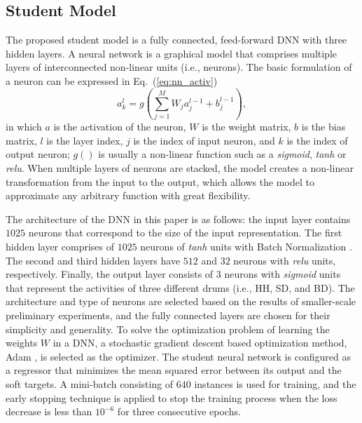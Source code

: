\documentclass{article}
\begin{document}
\subsection{Student Model}\label{subsec:nn}
The proposed student model is a fully connected, feed-forward DNN with three hidden layers. A neural network is a graphical model that comprises multiple layers of interconnected non-linear units (i.e., neurons). %
The basic formulation of a neuron can be expressed in Eq.~(\ref{eq:nn_activ})
\begin{equation}\label{eq:nn_activ}
a_{k}^{l} = g\left( \sum_{j=1}^{M} W_{j} a_{j}^{l-1} + b_{j}^{l-1}\right) ,
\end{equation}
in which $a$ is the activation of the neuron, $W$ is the weight matrix, $b$ is the bias matrix, $l$ is the layer index, $j$ is the index of input neuron, and $k$ is the index of output neuron; $g( )$ is usually a non-linear function such as a \textit{sigmoid}, \textit{tanh} or \textit{relu}. When multiple layers of neurons are stacked, the model creates a non-linear transformation from the input to the output, which allows the model to approximate any arbitrary function with great flexibility. 


The architecture of the DNN in this paper is as follows: the input layer contains $1025$ neurons that correspond to the size of the input representation. The first hidden layer comprises of $1025$ neurons of \textit{tanh} units with Batch Normalization \cite{Ioffe2015}. The second and third hidden layers have $512$ and $32$ neurons with \textit{relu} units, respectively. Finally, the output layer consists of 3 neurons with \textit{sigmoid} units that represent the activities of three different drums (i.e., HH, SD, and BD). The architecture and type of neurons are selected based on the results of smaller-scale preliminary experiments, and the fully connected layers are chosen for their simplicity and generality. To solve the optimization problem of learning the weights $W$ in a DNN, a stochastic gradient descent based optimization method, Adam \cite{Kingma2015}, is selected as the optimizer. The student neural network is configured as a regressor that minimizes the mean squared error between its output and the soft targets. A mini-batch consisting of $640$ instances is used for training, and the early stopping technique is applied to stop the training process when the loss decrease is less than $10^{-6}$ for three consecutive epochs. 
\end{document}
